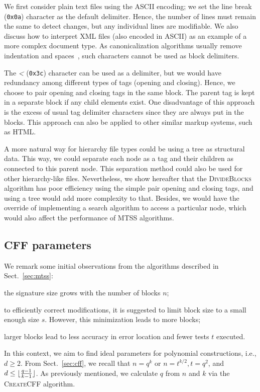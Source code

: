 \documentclass[12pt]{article}
\begin{document}
We first consider plain text files using the ASCII encoding; we set the line break (\texttt{0x0a}) character as the default delimiter. Hence, the number of lines must remain the same to detect changes, but any individual lines are modifiable. We also discuss how to interpret XML files (also encoded in ASCII) as an example of a more complex document type. As canonicalization algorithms usually remove indentation and spaces~\cite{w3-canonicalization-2008}, such characters cannot be used as block delimiters.

The \textit{\textless} (\texttt{0x3c}) character can be used as a delimiter, but we would have redundancy among different types of tags (opening and closing). Hence, we choose to pair opening and closing tags in the same block. The parent tag is kept in a separate block if any child elements exist. One disadvantage of this approach is the excess of usual tag delimiter characters since they are always put in the blocks. This approach can also be applied to other similar markup systems, such as HTML.

A more natural way for hierarchy file types could be using a tree as structural data. This way, we could separate each node as a tag and their children as connected to this parent node. This separation method could also be used for other hierarchy-like files. Nevertheless, we show hereafter that the \textsc{DivideBlocks} algorithm has poor efficiency using the simple pair opening and closing tags, and using a tree would add more complexity to that. Besides, we would have the override of implementing a search algorithm to access a particular node, which would also affect the performance of MTSS algorithms.


\subsection{CFF parameters}
\label{sec:cff-parameters}

We remark some initial observations from the algorithms described in Sect.~\ref{sec:mtss}:
\begin{enumerate*}[(i)]
  \item the signature size grows with the number of blocks $n$;
  \item to efficiently correct modifications, it is suggested to limit block size to a small enough size $s$. However, this minimization leads to more blocks;
  \item larger blocks lead to less accuracy in error location and fewer tests $t$ executed.
\end{enumerate*}
In this context, we aim to find ideal parameters for polynomial constructions, i.e., $d \geq 2$. From Sect.~\ref{sec:cff}, we recall that $n = q^k$ or $n = t^{k/2}, t = q^2$, and $d \leq \lfloor \frac{q-1}{k-1} \rfloor$. As previously mentioned, we calculate $q$ from $n$ and $k$ via the \textsc{CreateCFF} algorithm. 
\end{document}

